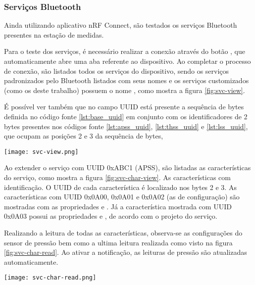 \subsubsection{Serviços Bluetooth}

Ainda utilizando aplicativo nRF Connect, são testados os serviços Bluetooth
presentes na estação de medidas.

Para o teste dos serviços, é necessário realizar a conexão através do botão
, que automaticamente abre uma aba referente ao dispositivo.
Ao completar o processo de conexão, são listados todos os serviços do
dispositivo, sendo os serviços padronizados pelo Bluetooth listados com seus
nomes e os serviços customizados (como os deste trabalho) possuem o nome
, como mostra a figura \ref{fig:svc-view}.

É possível ver também que no campo UUID está presente a sequência de bytes
definida no código fonte \ref{lst:base_uuid} em conjunto com os identificadores
de 2 bytes presentes nos códigos fonte \ref{lst:apss_uuid}, \ref{lst:thss_uuid}
e \ref{lst:lss_uuid}, que ocupam as posições 2 e 3 da sequência de bytes,

\begin{center}
	\centering 
	\texttt{[image: svc-view.png]}
	\label{fig:svc-view}
\end{center} 


Ao extender o serviço com UUID 0xABC1 (APSS), são listadas as características do
serviço, como mostra a figura \ref{fig:svc-char-view}. As características com
identificação. O UUID de cada característica é localizado nos bytes 2 e 3. As
características com UUID 0x0A00, 0x0A01 e 0x0A02 (as de configuração) são
mostradas com as propriedades  e . Já a
característica mostrada com UUID 0x0A03 possui as propriedades  e
, de acordo com o projeto do serviço.


Realizando a leitura de todas as características, observa-se as configurações do
sensor de pressão bem como a ultima leitura realizada como visto na figura
\ref{fig:svc-char-read}. Ao ativar a notificação, as leituras de pressão são
atualizadas automaticamente.


\begin{center}
	\centering 
	\texttt{[image: svc-char-read.png]}
	\label{fig:svc-char-read}
\end{center} 

